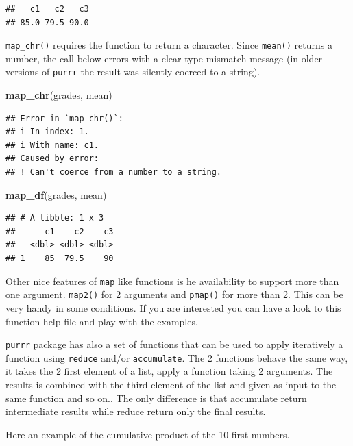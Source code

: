 \documentclass[
]{book}
\newenvironment{Shaded}{\begin{snugshade}}{\end{snugshade}}
\newcommand{\FunctionTok}[1]{\textcolor[rgb]{0.13,0.29,0.53}{\textbf{#1}}}
\newcommand{\NormalTok}[1]{#1}
\theoremstyle{definition}
\theoremstyle{definition}
\theoremstyle{definition}
\theoremstyle{definition}
\theoremstyle{remark}
\begin{document}
\begin{verbatim}
##   c1   c2   c3 
## 85.0 79.5 90.0
\end{verbatim}

\texttt{map\_chr()} requires the function to return a character. Since \texttt{mean()} returns
a number, the call below errors with a clear type-mismatch message (in older
versions of \texttt{purrr} the result was silently coerced to a string).

\begin{Shaded}
\begin{Highlighting}[]
\FunctionTok{map\_chr}\NormalTok{(grades, mean)}
\end{Highlighting}
\end{Shaded}

\begin{verbatim}
## Error in `map_chr()`:
## i In index: 1.
## i With name: c1.
## Caused by error:
## ! Can't coerce from a number to a string.
\end{verbatim}

\begin{Shaded}
\begin{Highlighting}[]
\FunctionTok{map\_df}\NormalTok{(grades, mean)}
\end{Highlighting}
\end{Shaded}

\begin{verbatim}
## # A tibble: 1 x 3
##      c1    c2    c3
##   <dbl> <dbl> <dbl>
## 1    85  79.5    90
\end{verbatim}

Other nice features of \texttt{map} like functions is he availability to support more than one argument.
\texttt{map2()} for 2 arguments and \texttt{pmap()} for more than 2. This can be very handy in some conditions.
If you are interested you can have a look to this function help file and play with the examples.

\texttt{purrr} package has also a set of functions that can be used to apply iteratively a function using \texttt{reduce} and/or \texttt{accumulate}. The 2 functions behave the same way, it takes the 2 first element of a list, apply a function taking 2 arguments. The results is combined with the third element of the list and given as input to the same function and so on.. The only difference is that accumulate return intermediate results while reduce return only the final results.

Here an example of the cumulative product of the 10 first numbers.
\end{document}
